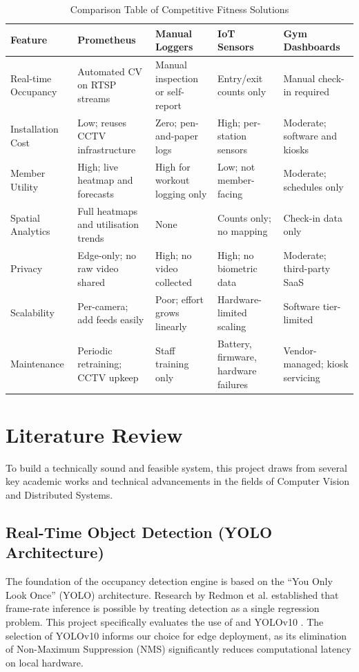 \begin{table}[h]
\centering
\footnotesize %
\renewcommand{\arraystretch}{1.5} %
\setlength{\tabcolsep}{4pt} %

\begin{tabularx}{\textwidth}{|l|X|X|X|X|}
\hline
\textbf{Feature} & \textbf{Prometheus} & \textbf{Manual Loggers} & \textbf{IoT Sensors} & \textbf{Gym Dashboards} \\ \hline
Real-time Occupancy & Automated CV on RTSP streams & Manual inspection or self-report & Entry/exit counts only & Manual check-in required \\ \hline
Installation Cost & Low; reuses CCTV infrastructure & Zero; pen-and-paper logs & High; per-station sensors & Moderate; software and kiosks \\ \hline
Member Utility & High; live heatmap and forecasts & High for workout logging only & Low; not member-facing & Moderate; schedules only \\ \hline
Spatial Analytics & Full heatmaps and utilisation trends & None & Counts only; no mapping & Check-in data only \\ \hline
Privacy & Edge-only; no raw video shared & High; no video collected & High; no biometric data & Moderate; third-party SaaS \\ \hline
Scalability & Per-camera; add feeds easily & Poor; effort grows linearly & Hardware-limited scaling & Software tier-limited \\ \hline
Maintenance & Periodic retraining; CCTV upkeep & Staff training only & Battery, firmware, hardware failures & Vendor-managed; kiosk servicing \\ \hline
\end{tabularx}
\caption{Comparison Table of Competitive Fitness Solutions}
\label{table:competitor-analysis}
\end{table}

\section{Literature Review}
\label{section:literature-review}

To build a technically sound and feasible system, this project draws from several key academic works and technical advancements in the fields of Computer Vision and Distributed Systems.

\subsection{Real-Time Object Detection (YOLO Architecture)}
The foundation of the occupancy detection engine is based on the ``You Only Look Once'' (YOLO) architecture. Research by Redmon et al. established that frame-rate inference is possible by treating detection as a single regression problem. This project specifically evaluates the use of \cite{ultralytics:yolov8} and YOLOv10 \cite{wang2024yolov10}. The selection of YOLOv10 informs our choice for edge deployment, as its elimination of Non-Maximum Suppression (NMS) significantly reduces computational latency on local hardware.

